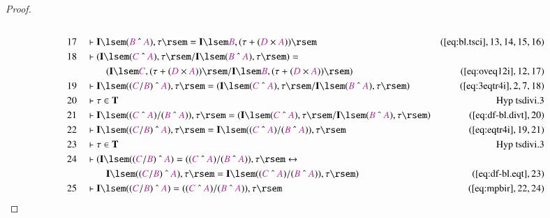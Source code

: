 \begin{proof}
\begin{align}
  \\ 17 &&  & \vdash \mathbf{I} \lsem ( \mc{B} ~\string^~ \mc{A} ) , \tau \rsem
      = \mathbf{I} \lsem \mc{B} , ( \tau + ( \mc{D} \times
      \mc{A} ) )
      \rsem&(\mbox{\ref{eq:bl.tsci}},13,14,15,16)\notag
  \\ 18 &&  & \vdash ( \mathbf{I} \lsem ( \mc{C} ~\string^~ \mc{A} ) , \tau
      \rsem / \mathbf{I} \lsem ( \mc{B} ~\string^~ \mc{A} )
      , \tau \rsem ) =  \notag \\ & & & \qquad
     ( \mathbf{I} \lsem \mc{C} , ( \tau +
      ( \mc{D} \times \mc{A} ) ) \rsem / \mathbf{I} \lsem
      \mc{B} , ( \tau + ( \mc{D} \times \mc{A} ) ) \rsem
      )&(\mbox{\ref{eq:oveq12i}},12,17)\notag
  \\ 19 &&  & \vdash \mathbf{I} \lsem ( ( \mc{C} / \mc{B} ) ~\string^~ \mc{A} )
      , \tau \rsem = ( \mathbf{I} \lsem ( \mc{C} ~\string^~
      \mc{A} ) , \tau \rsem / \mathbf{I} \lsem ( \mc{B}
      ~\string^~ \mc{A} ) , \tau \rsem
      )&(\mbox{\ref{eq:3eqtr4i}},2,7,18)\notag
  \\ 20 &&  & \vdash \tau \in \mathbf{T}&\text{Hyp~tsdivi.3}\notag%
  \\ 21 &&  & \vdash \mathbf{I} \lsem ( ( \mc{C} ~\string^~ \mc{A} ) / ( \mc{B}
      ~\string^~ \mc{A} ) ) , \tau \rsem = ( \mathbf{I}
      \lsem ( \mc{C} ~\string^~ \mc{A} ) , \tau \rsem /
      \mathbf{I} \lsem ( \mc{B} ~\string^~ \mc{A} ) , \tau
      \rsem )&(\mbox{\ref{eq:df-bl.divt}},20)\notag
  \\ 22 &&  & \vdash \mathbf{I} \lsem ( ( \mc{C} / \mc{B} ) ~\string^~ \mc{A} )
      , \tau \rsem = \mathbf{I} \lsem ( ( \mc{C} ~\string^~
      \mc{A} ) / ( \mc{B} ~\string^~ \mc{A} ) ) , \tau
      \rsem&(\mbox{\ref{eq:eqtr4i}},19,21)\notag
  \\ 23 &&  & \vdash \tau \in \mathbf{T}&\text{Hyp~tsdivi.3}\notag%
  \\ 24 &&  & \vdash ( \mathbf{I} \lsem ( ( \mc{C} / \mc{B} ) ~\string^~ \mc{A}
      ) = ( ( \mc{C} ~\string^~ \mc{A} ) / ( \mc{B}
      ~\string^~ \mc{A} ) ) , \tau \rsem \leftrightarrow  \notag \\ & & & \qquad
      \mathbf{I} \lsem ( ( \mc{C} / \mc{B} ) ~\string^~
      \mc{A} ) , \tau \rsem = \mathbf{I} \lsem ( ( \mc{C}
      ~\string^~ \mc{A} ) / ( \mc{B} ~\string^~ \mc{A} ) )
      , \tau \rsem )&(\mbox{\ref{eq:df-bl.eqt}},23)\notag
  \\ 25 &&  & \vdash \mathbf{I} \lsem ( ( \mc{C} / \mc{B} ) ~\string^~ \mc{A} )
      = ( ( \mc{C} ~\string^~ \mc{A} ) / ( \mc{B}
      ~\string^~ \mc{A} ) ) , \tau
      \rsem&(\mbox{\ref{eq:mpbir}},22,24)\notag
\end{align}
\end{proof}

